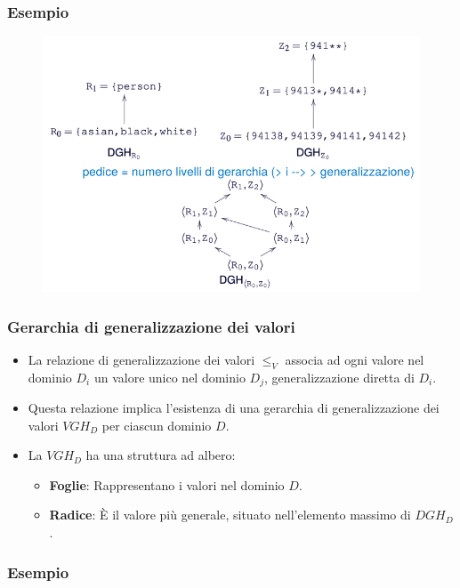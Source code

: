 \documentclass{report}
\begin{document}
\subsubsection{Esempio}
\begin{figure}[ht]
    \centering
    \includegraphics[width=1\linewidth]{images/domger.png}
\end{figure}


\subsubsection{Gerarchia di generalizzazione dei valori}

\begin{itemize}
    \item La relazione di generalizzazione dei valori \( \leq_V \) associa ad ogni valore nel dominio \( D_i \) un valore unico nel dominio \( D_j \), generalizzazione diretta di \( D_i \). 
    \item Questa relazione implica l'esistenza di una gerarchia di generalizzazione dei valori $ VGH_{D} $ per ciascun dominio \( D \).
    \item La $ VGH_{D} $ ha una struttura ad albero:
    \begin{itemize}
        \item \textbf{Foglie}: Rappresentano i valori nel dominio \( D \).
        \item \textbf{Radice}: È il valore più generale, situato nell'elemento massimo di $ DGH_{D} $.
    \end{itemize}
\end{itemize}

\newpage
\subsubsection{Esempio}
\end{document}
